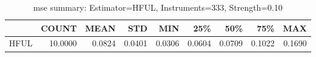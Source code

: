 \begin{table}[ht]
\centering
\caption{mse summary: Estimator=HFUL, Instruments=333, Strength=0.10}
\begin{tabular}{lrrrrrrrr}
\toprule
 & COUNT & MEAN & STD & MIN & 25\% & 50\% & 75\% & MAX \\
\midrule
HFUL & 10.0000 & 0.0824 & 0.0401 & 0.0306 & 0.0604 & 0.0709 & 0.1022 & 0.1690 \\
\bottomrule
\end{tabular}
\end{table}
